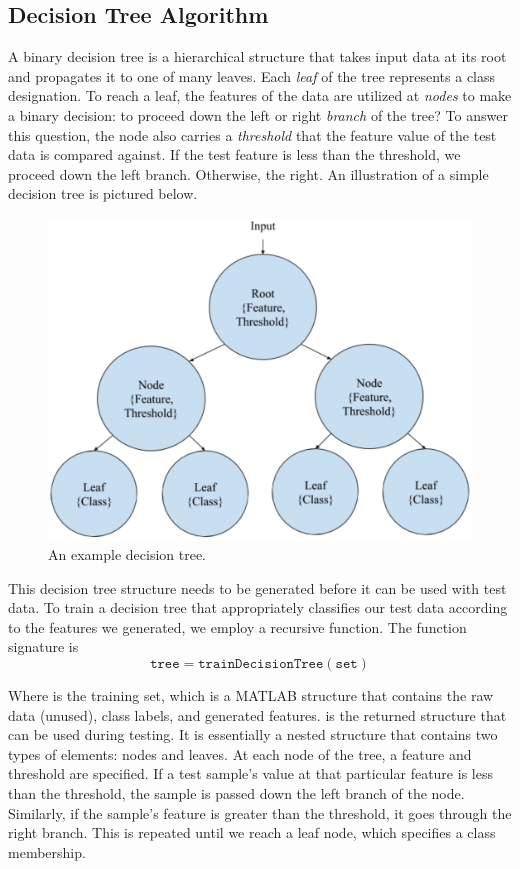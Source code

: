 \subsection{Decision Tree Algorithm}

A binary decision tree is a hierarchical structure that takes input data at its root and propagates it to one of many leaves. Each \emph{leaf} of the tree represents a class designation. To reach a leaf, the features of the data are utilized at \emph{nodes} to make a binary decision: to proceed down the left or right \emph{branch} of the tree? To answer this question, the node also carries a \emph{threshold} that the feature value of the test data is compared against. If the test feature is less than the threshold, we proceed down the left branch. Otherwise, the right. An illustration of a simple decision tree is pictured below.
%
\begin{figure}[H]
  \centering\includegraphics[width=0.6\columnwidth]{../images/decision_tree}
  \caption{An example decision tree.}
\end{figure}

This decision tree structure needs to be generated before it can be used with test data. To train a decision tree that appropriately classifies our test data according to the features we generated, we employ a recursive function. The function signature is
%
\begin{equation*}
  \mathtt{tree = trainDecisionTree(set)}
\end{equation*}

Where  is the training set, which is a MATLAB structure that contains the raw data (unused), class labels, and generated features.  is the returned structure that can be used during testing. It is essentially a nested structure that contains two types of elements: nodes and leaves. At each node of the tree, a feature and threshold are specified. If a test sample's value at that particular feature is less than the threshold, the sample is passed down the left branch of the node. Similarly, if the sample's feature is greater than the threshold, it goes through the right branch. This is repeated until we reach a leaf node, which specifies a class membership. 

